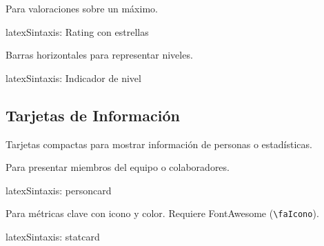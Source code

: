 \noindent
{} \quad {} \quad {} \quad {}

Para valoraciones sobre un máximo.

\begin{codigosimple}{latex}{Sintaxis: Rating con estrellas}
\end{codigosimple}

\noindent
{} \quad {} \quad {}

Barras horizontales para representar niveles.

\begin{codigosimple}{latex}{Sintaxis: Indicador de nivel}
\end{codigosimple}

\noindent
{} \quad {} \quad {}

\subsection{Tarjetas de Información}
\label{subsec:tarjetas}

Tarjetas compactas para mostrar información de personas o estadísticas.

Para presentar miembros del equipo o colaboradores.

\begin{codigosimple}{latex}{Sintaxis: personcard}
\end{codigosimple}

\noindent
{}
\hfill
{}

Para métricas clave con icono y color. Requiere FontAwesome (\verb|\faIcono|).

\begin{codigosimple}{latex}{Sintaxis: statcard}
\end{codigosimple}

\vspace{1em}
\noindent
{}
\hfill
{}
\hfill
{}
\hfill
{}

